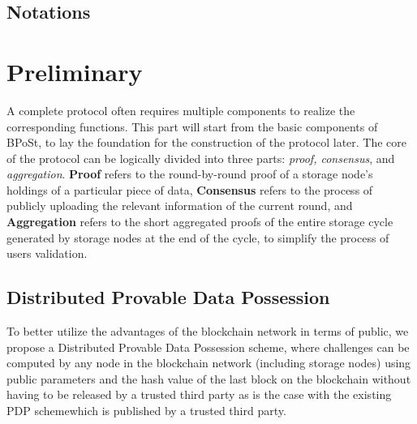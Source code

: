 \documentclass[journal]{IEEEtran}
\begin{document}
\subsection{Notations}


\section{Preliminary}
A complete protocol often requires multiple components to realize the corresponding functions. This part will start from the basic components of BPoSt, to lay the foundation for the construction of the protocol later. The core of the protocol can be logically divided into three parts: \textit{proof, consensus}, and \textit{ aggregation}. \textbf{Proof} refers to the round-by-round proof of a storage node's holdings of a particular piece of data, \textbf{Consensus} refers to the process of publicly uploading the relevant information of the current round, and \textbf{Aggregation} refers to the short aggregated proofs of the entire storage cycle generated by storage nodes at the end of the cycle, to simplify the process of users validation.


\subsection{Distributed Provable Data Possession}
To better utilize the advantages of the blockchain network in terms of public, we propose a Distributed Provable Data Possession scheme, where challenges can be computed by any node in the blockchain network (including storage nodes) using public parameters and the hash value of the last block on the blockchain without having to be released by a trusted third party as is the case with the existing PDP scheme\cite{2007pdp, 2013compact}which is published by a trusted third party.
\end{document}
